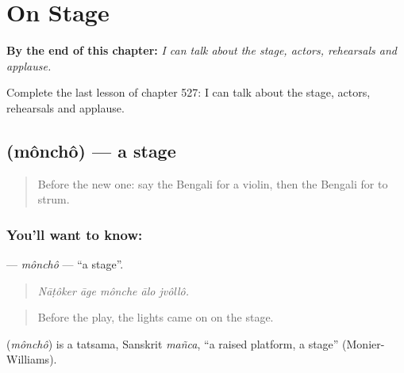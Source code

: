 
\chapter{On Stage}
\label{ch:bn-on-stage}

\begin{chapteropening}
\textbf{By the end of this chapter:} \emph{I can talk about the stage, actors, rehearsals and applause.}

Complete the last lesson of chapter 527: I can talk about the stage, actors, rehearsals and applause.
\end{chapteropening}

\section[\texorpdfstring{\bn{মঞ্চ} (mônchô)}{মঞ্চ (mônchô)}]{ (mônchô) — a stage}

\label{lesson:BN-C527-moncho}



\begin{quote}
Before the new one: say the Bengali for a violin, then the Bengali for to strum.
\end{quote}

\subsection*{You'll want to know: }
\textbf{} — \emph{mônchô} — \textquotedblleft{}a stage\textquotedblright{}.

\begin{quote}
    
\end{quote}

\begin{quote}
\emph{Nāṭôker āge mônche ālo jvôllô.}
\end{quote}

\begin{quote}
Before the play, the lights came on on the stage.
\end{quote}

\begin{cousinweb}
\textbf{} (\emph{mônchô}) is a tatsama, Sanskrit \emph{mañca}, \textquotedblleft{}a raised platform, a stage\textquotedblright{} (Monier-Williams).
\end{cousinweb}


